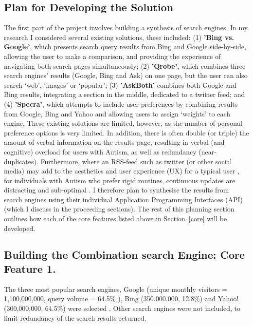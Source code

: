 \documentclass[a4paper, 11pt]{article}
\begin{document}
\begin{justify}
\section{Plan for Developing the Solution}\label{sol}
The first part of the project involves building a synthesis of search engines. In my research I considered several existing solutions, these included: (1) \textbf{'Bing vs. Google'}\cite{bingvsgoogle}, which presents search query results from Bing and Google side-by-side, allowing the user to make a comparison, and providing the experience of navigating both search pages simultaneously; (2) \textbf{'Qrobe'}\cite{qrobe}, which combines three search engines’ results (Google, Bing and Ask) on one page, but the user can also search ‘web’, ‘images’ or ‘popular’; (3) \textbf{'AskBoth'}\cite{askboth} combines both Google and Bing results, integrating a section in the middle, dedicated to a twitter feed; and (4) \textbf{'Specra'}\cite{specra}, which attempts to include user preferences by combining results from Google, Bing and Yahoo and allowing users to assign `weights' to each engine. These existing solutions are limited, however, as the number of personal preference options is very limited. In addition, there is often double (or triple) the amount of verbal information on the results page, resulting in verbal (and cognitive) overload for users with Autism, as well as redundancy (near-duplicates). Furthermore, where an RSS-feed such as twitter (or other social media) may add to the aesthetics and user experience (UX) for a typical user \cite{social}, for individuals with Autism who prefer rigid routines, continuous updates are distracting and sub-optimal \cite{disengagement}. I therefore plan to synthesise the results from search engines using their individual Application Programming Interfaces (API) (which I discuss in the proceeding sections). The rest of this planning section outlines how each of the core features listed above in Section~\ref{core} will be developed.

\subsection{Building the Combination search Engine: Core Feature 1.} 
The three most popular search engines, Google (unique monthly visitors = 1,100,000,000, query volume = 64.5\% ), Bing (350.000.000, 12.8\%) and Yahoo! (300,000,000, 64.5\%) were selected \cite{ebiz, adam}. Other search engines were not included, to limit redundancy of the search results returned.


\end{justify}
\end{document}
